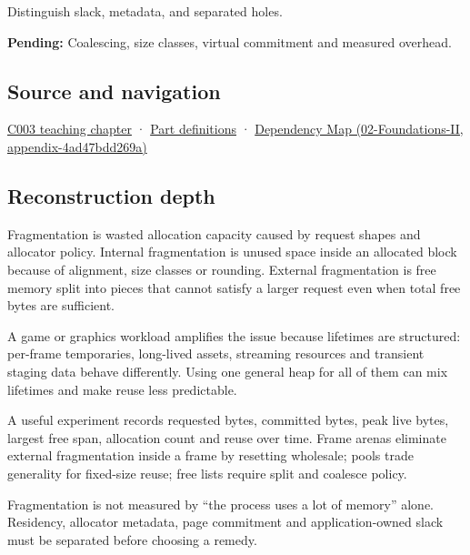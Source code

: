 Distinguish slack, metadata, and separated holes.

\textbf{Pending:} Coalescing, size classes, virtual commitment and measured overhead.

\subsection{Source and navigation}\label{source-and-navigation}

\href{Continuous\%20Notes/Computing\%20Foundations\%20-\%20From\%20Bits\%20to\%20C++\%20and\%20Systems\%20APIs\#Where\%20the\%20bytes\%20live}{C003 teaching chapter} · \hyperref[appendix-fd090d982a15]{Part definitions} · \href{}{Dependency Map (02-Foundations-II, appendix-4ad47bdd269a)}

\subsection{Reconstruction depth}\label{reconstruction-depth}

Fragmentation is wasted allocation capacity caused by request shapes and allocator policy. Internal fragmentation is unused space inside an allocated block because of alignment, size classes or rounding. External fragmentation is free memory split into pieces that cannot satisfy a larger request even when total free bytes are sufficient.

A game or graphics workload amplifies the issue because lifetimes are structured: per-frame temporaries, long-lived assets, streaming resources and transient staging data behave differently. Using one general heap for all of them can mix lifetimes and make reuse less predictable.

A useful experiment records requested bytes, committed bytes, peak live bytes, largest free span, allocation count and reuse over time. Frame arenas eliminate external fragmentation inside a frame by resetting wholesale; pools trade generality for fixed-size reuse; free lists require split and coalesce policy.

Fragmentation is not measured by ``the process uses a lot of memory'' alone. Residency, allocator metadata, page commitment and application-owned slack must be separated before choosing a remedy.
